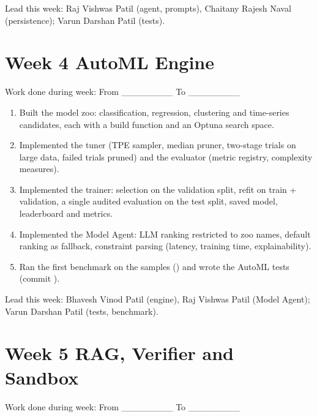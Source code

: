 Lead this week: Raj Vishwas Patil (agent, prompts), Chaitany Rajesh Naval (persistence); Varun Darshan Patil (tests).

\FloatBarrier
\setcounter{secnumdepth}{0}
\section{Week 4 \textemdash{} AutoML Engine}
\setcounter{secnumdepth}{2}

Work done during week: From \_\_\_\_\_\_\_\_ To \_\_\_\_\_\_\_\_

\begin{enumerate}
  \item Built the model zoo: classification, regression, clustering and time-series candidates, each with a build function and an Optuna search space.
  \item Implemented the tuner (TPE sampler, median pruner, two-stage trials on large data, failed trials pruned) and the evaluator (metric registry, complexity measures).
  \item Implemented the trainer: selection on the validation split, refit on train + validation, a single audited evaluation on the test split, saved model, leaderboard and metrics.
  \item Implemented the Model Agent: LLM ranking restricted to zoo names, default ranking as fallback, constraint parsing (latency, training time, explainability).
  \item Ran the first benchmark on the samples () and wrote the AutoML tests (commit ).
\end{enumerate}

Lead this week: Bhavesh Vinod Patil (engine), Raj Vishwas Patil (Model Agent); Varun Darshan Patil (tests, benchmark).

\FloatBarrier
\setcounter{secnumdepth}{0}
\section{Week 5 \textemdash{} RAG, Verifier and Sandbox}
\setcounter{secnumdepth}{2}

Work done during week: From \_\_\_\_\_\_\_\_ To \_\_\_\_\_\_\_\_

